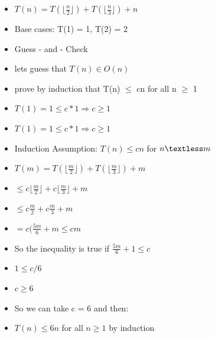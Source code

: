 \documentclass[12pt,a4paper]{report}
\begin{document}
\begin{itemize}
\item $T(n) = T(\lfloor \frac{n}{2} \rfloor) + T(\lfloor \frac{n}{3} \rfloor) + n$
\item Base cases: T(1) = 1, T(2) = 2
\item Guess - and - Check
\item lets guess that $T(n)\in O(n)$
\item prove by induction that T(n) $\leq$ cn for all n $\geq$ 1
\item $T(1) = 1 \leq c*1 \Rightarrow c \geq 1$
\item $T(1) = 1 \leq c*1 \Rightarrow c \geq 1$
\item Induction Assumption: $T(n) \leq cn$ for $n \textless m$
\item $T(m) = T(\lfloor \frac{m}{2} \rfloor) + T(\lfloor \frac{m}{3} \rfloor) + m$
\item $\leq c\lfloor \frac{m}{2} \rfloor + c\lfloor \frac{m}{3} \rfloor + m$
\item $\leq c\frac{m}{2} + c\frac{m}{3} + m$
\item $= c(\frac{5m}{6} + m \leq cm$
\item So the inequality is true if $ \frac{5m}{6} + 1 \leq c$
\item $1 \leq c/6$
\item $c \geq 6$
\item So we can take c = 6 and then:
\item $ T(n) \leq 6n$ for all $ n \geq 1$ by induction
\end{itemize}
\end{document}
